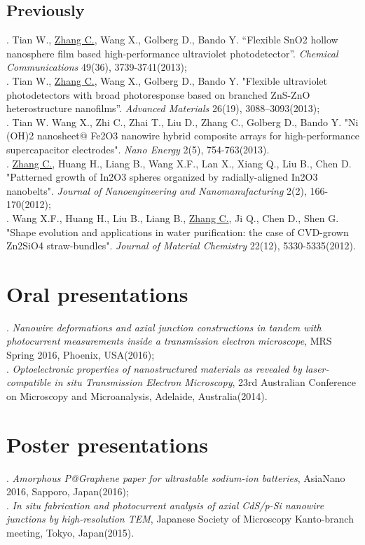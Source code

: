 \subsection*{Previously}
. Tian W., \underline{Zhang C.}, Wang X., Golberg D., Bando Y. “Flexible SnO2 hollow nanosphere film based high-performance ultraviolet photodetector”. {\em Chemical Communications} 49(36), 3739-3741(2013);\\[5pt]
. Tian W., \underline{Zhang C.}, Wang X., Golberg D., Bando Y. "Flexible ultraviolet photodetectors with broad photoresponse based on branched ZnS-ZnO heterostructure nanofilms”. {\em Advanced Materials} 26(19), 3088–3093(2013);\\[5pt] 
. Tian W. Wang X., Zhi C., Zhai T., Liu D., Zhang C., Golberg D., Bando Y. "Ni (OH)2 nanosheet@ Fe2O3 nanowire hybrid composite arrays for high-performance supercapacitor electrodes". {\em Nano Energy} 2(5), 754-763(2013).\\[5pt]
. \underline{Zhang C.}, Huang H., Liang B., Wang X.F., Lan X., Xiang Q., Liu B., Chen D. "Patterned growth of In2O3 spheres organized by radially-aligned In2O3 nanobelts". {\em Journal of Nanoengineering and Nanomanufacturing} 2(2), 166-170(2012);\\[5pt]
. Wang X.F., Huang H., Liu B., Liang B., \underline{Zhang C.}, Ji Q., Chen D., Shen G. "Shape evolution and applications in water purification: the case of CVD-grown Zn2SiO4 straw-bundles". {\em Journal of Material Chemistry} 22(12), 5330-5335(2012).\\

\section*{Oral presentations}

. {\em Nanowire deformations and axial junction constructions in tandem with photocurrent measurements inside a transmission electron microscope}, MRS Spring 2016, Phoenix, USA(2016);\\[15pt]

. {\em Optoelectronic properties of nanostructured materials as revealed by laser-compatible in situ Transmission Electron Microscopy}, 23rd Australian Conference on Microscopy and Microanalysis, Adelaide, Australia(2014). 

\section*{Poster presentations}
. {\em Amorphous P@Graphene paper for ultrastable sodium-ion batteries}, AsiaNano 2016, Sapporo, Japan(2016);\\[15pt]
. {\em In situ fabrication and photocurrent analysis of axial CdS/p-Si nanowire junctions by high-resolution TEM}, Japanese Society of Microscopy Kanto-branch meeting, Tokyo, Japan(2015). 



\vfill{}
